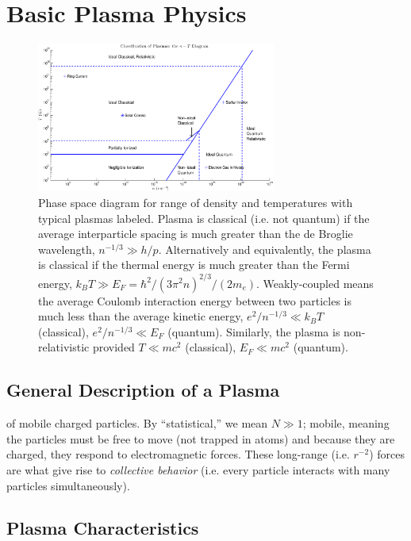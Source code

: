 \chapter{Basic Plasma Physics}

\begin{figure}
\centering
\includegraphics[width=0.7\textwidth]{figures/nT_diagram.eps}
\caption{Phase space diagram for range of density and temperatures with typical plasmas labeled. Plasma is classical (i.e. not quantum) if the average interparticle spacing is much greater than the de Broglie wavelength, $n^{-1/3}\gg h/p$. Alternatively and equivalently, the plasma is classical if the thermal energy is much greater than the Fermi energy, $k_BT\gg E_F=\hbar^2/(3\pi^2n)^{2/3}/(2m_e)$. Weakly-coupled means the average Coulomb interaction energy between two particles is much less than the average kinetic energy, $e^2/n^{-1/3}\ll k_BT$ (classical), $e^2/n^{-1/3}\ll E_F$ (quantum). Similarly, the plasma is non-relativistic provided $T\ll mc^2$ (classical), $E_F\ll mc^2$ (quantum). }
\end{figure}

\section{General Description of a Plasma} 

 of mobile charged particles. By ``statistical,'' we mean $N\gg1$; mobile, meaning the particles must be free to move (not trapped in atoms) and because they are charged, they respond to electromagnetic forces. These long-range (i.e. $r^{-2}$) forces are what give rise to \textit{collective behavior} (i.e. every particle interacts with many particles simultaneously).

%
\section{Plasma Characteristics}

